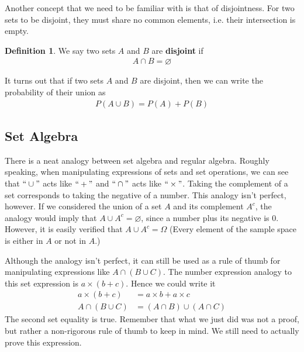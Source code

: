 \documentclass{tufte-book}
\theoremstyle{definition}
\numberwithin{theorem}{section}
\newtheorem{definition}[theorem]{Definition}
\numberwithin{definition}{section}
\numberwithin{lemma}{section}
\numberwithin{corollary}{section}
\numberwithin{proposition}{section}
\numberwithin{remark}{section}
\numberwithin{claim}{section}
\numberwithin{observation}{section}
\numberwithin{fact}{section}
\numberwithin{assumption}{section}
\numberwithin{example}{section}
\numberwithin{exercise}{section}
\begin{document}
Another concept that we need to be familiar with is that of disjointness. For two sets to be disjoint, they must share no common elements, i.e. their intersection is empty.
\begin{definition}
We say two sets $A$ and $B$ are \textbf{disjoint} if
\begin{align*}
A \cap B = \varnothing
\end{align*}
\end{definition}
It turns out that if two sets $A$ and $B$ are disjoint, then we can write the probability of their union as
\begin{align*}
P(A \cup B) = P(A) + P(B)
\end{align*}


\subsection{Set Algebra}

There is a neat analogy between set algebra and regular algebra. Roughly speaking, when manipulating expressions of sets and set operations, we can see that $``\cup"$ acts like $``+"$ and $``\cap"$ acts like $``\times"$. Taking the complement of a set corresponds to taking the negative of a number. This analogy isn't perfect, however. If we considered the union of a set $A$ and its complement $A^c$, the analogy would imply that $A \cup A^c = \varnothing$, since a number plus its negative is 0. However, it is easily verified that $A \cup A^c = \Omega$ (Every element of the sample space is either in $A$ or not in $A$.)

Although the analogy isn't perfect, it can still be used as a rule of thumb for manipulating expressions like $A \cap (B \cup C)$. The number expression analogy to this set expression is $a \times (b + c)$. Hence we could write it
\begin{align*}
a \times (b + c) &= a \times b + a \times c \\
A \cap (B \cup C) &= (A \cap B) \cup (A \cap C)
\end{align*}
The second set equality is true. Remember that what we just did was not a proof, but rather a non-rigorous rule of thumb to keep in mind. We still need to actually prove this expression.
\end{document}
